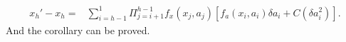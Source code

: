 \documentclass{article} %
\newcommand{\vmax}{V_{max}}
\begin{document}
\begin{align}
        x_h' - x_h  
      = & \sum_{i=h-1}^1 \Pi_{j=i+1}^{h-1}f_x(x_j, a_j)\left[ f_a(x_i, a_i)\delta a_i  +C ( \delta a_i ^2) \right] .
\end{align}
And the corollary can be proved.
 






\end{document}
